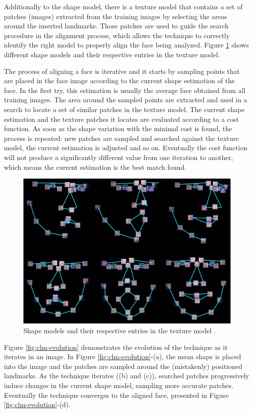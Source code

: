 Additionally to the shape model, there is a texture model that contains a set of patches (images) extracted from the training images by selecting the areas around the inserted landmarks. Those patches are used to guide the search procedure in the alignment process, which allows the technique to correctly identify the right model to properly align the face being analyzed. Figure \ref{fig:clm-patches} shows different shape models and their respective entries in the texture model.

The process of aligning a face is iterative and it starts by sampling points that are placed in the face image according to the current shape estimation of the face. In the first try, this estimation is usually the average face obtained from all training images. The area around the sampled points are extracted and used in a search to locate a set of similar patches in the texture model. The current shape estimation and the texture patches it locates are evaluated according to a cost function. As soon as the shape variation with the minimal cost is found, the process is repeated: new patches are sampled and searched against the texture model, the current estimation is adjusted and so on. Eventually the cost function will not produce a significantly different value from one iteration to another, which means the current estimation is the best match found.

\begin{figure}[h]
    \centering
    \includegraphics[width=0.6\linewidth]{figures/clm-patches.jpg}
    \caption{Shape models and their respective entries in the texture model \parencite{yu2010facial}.}
    \label{fig:clm-patches}
\end{figure}

Figure \ref{fig:clm-evolution} demonstrates the evolution of the technique as it iterates in an image. In Figure \ref{fig:clm-evolution}-(a), the mean shape is placed into the image and the patches are sampled around the (mistakenly) positioned landmarks. As the technique iterates ((b) and (c)), searched patches progressively induce changes in the current shape model, sampling more accurate patches. Eventually the technique converges to the aligned face, presented in Figure \ref{fig:clm-evolution}-(d).

